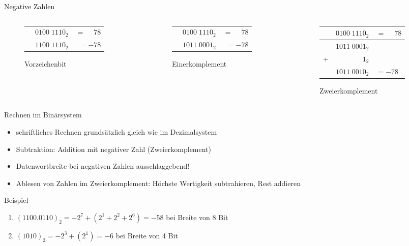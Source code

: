 \begin{frame}[c]{Negative Zahlen}{}
	\begin{columns}[c]
		\begin{column}{0.3\textwidth}
			\begin{figure}
				\begin{tabular}{crr}
					 & $0100\;1110_2$                        & $=\phantom{-}78$ \\
					 & \textcolor{TUMBlue}{$1$}$100\;1110_2$ & $=-78$
				\end{tabular}
				\caption{Vorzeichenbit}
			\end{figure}
		\end{column}
		\begin{column}{0.3\textwidth}
			\begin{figure}
				\begin{tabular}{crr}
					 & $0100\;1110_2$ & $=\phantom{-}78$ \\
					 & $1011\;0001_2$ & $=-78$
				\end{tabular}
				\caption{Einerkomplement}
			\end{figure}
		\end{column}
		\begin{column}{0.3\textwidth}
			\begin{figure}
				\begin{tabular}{rrl}
					  & $0100\;1110_2$ & $=\phantom{-}78$ \\\hline
					  & $1011\;0001_2$ &                  \\
					+ & $1_2$          &                  \\\hline
					  & $1011\;0010_2$ & $=-78$
				\end{tabular}
				\caption{Zweierkomplement}
			\end{figure}
		\end{column}
	\end{columns}
\end{frame}

\begin{frame}[c]{Rechnen im Binärsystem}{}
	\begin{itemize}
		\item schriftliches Rechnen grundsätzlich gleich wie im Dezimalsystem
		\item Subtraktion: Addition mit negativer Zahl (Zweierkomplement)
		\item Datenwortbreite bei negativen Zahlen ausschlaggebend!
		\item Ablesen von Zahlen im Zweierkomplement: Höchste Wertigkeit subtrahieren, Rest addieren
	\end{itemize}
	\vfill{}
	\begin{block}{Beispiel}
		\begin{enumerate}
			\item $(1100.0110)_2 = -2^7+(2^1+2^2+2^6)=-58$ bei Breite von 8 Bit
			\item $(1010)_2 = -2^3 + (2^1) = -6$ bei Breite von 4 Bit
		\end{enumerate}
	\end{block}
\end{frame}

